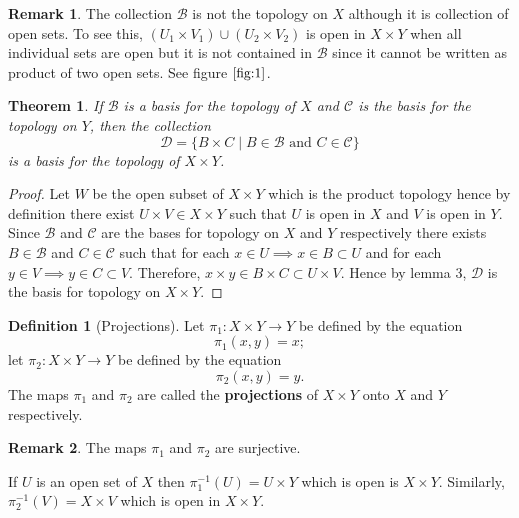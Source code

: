 \documentclass[12pt,reqno]{amsart}
\theoremstyle{plain}
\newtheorem{thm}{Theorem}
\theoremstyle{definition}
\newtheorem{defn}{Definition}
\newtheorem{rem}{Remark}
\newcommand{\cal}[1]{\mathcal{#1}}
\begin{document}
\begin{rem}
    The collection $\cal B$ is not the topology on $X$ although it is collection of open sets. To see this, $(U_1 \times V_1) \cup (U_2 \times V_2)$ is open in $X \times Y$ when all individual sets are open but it is not contained in $\cal B$ since it cannot be written as product of two open sets. See figure $\ref{fig:1}$.
    \begin{figure}[!ht]
        \caption{}
        \label{fig:1}
    \end{figure}
\end{rem}

\begin{thm}
    If $\cal B$ is a basis for the topology of $X$ and $\cal C$ is the basis for the topology on $Y$, then the collection
    $$ \cal D = \{B \times C \mid B \in \cal B \text{ and } C \in \cal C\} $$ 
    is a basis for the topology of $X \times Y$.
\end{thm}
\begin{proof}
    Let $W$ be the open subset of $X \times Y$ which is the product topology hence by definition there exist $U \times V \in X \times Y$ such that $U$ is open in $X$ and $V$ is open in $Y$. Since $\cal B$ and $\cal C$ are the bases for topology on $X$ and $Y$ respectively there exists $B \in \cal B$ and $C \in \cal C$ such that for each $x \in U \implies x \in B \subset U$ and for each $y \in V \implies y \in C \subset V$. Therefore, $x \times y \in B \times C \subset U \times V$. Hence by lemma $3$, $\cal D$ is the basis for topology on $X \times Y$.    
\end{proof}

\begin{defn}[Projections]
    Let $\pi_1 : X \times Y \to Y$ be defined by the equation
    $$ \pi_1(x,y) = x;$$ 
    let $\pi_2 : X \times Y \to Y$ be defined by the equation
    $$ \pi_2(x,y) = y.$$
    The maps $\pi_1$ and $\pi_2$ are called the {\bf projections} of $X \times Y$ onto $X$ and $Y$ respectively.
\end{defn}
\begin{rem}
    The maps $\pi_1$ and $\pi_2$ are surjective.
\end{rem}
If $U$ is an open set of $X$ then $\pi_1^{-1}(U) = U \times Y$ which is open is $X \times Y$. Similarly, $\pi_2^{-1}(V) = X \times V$ which is open in $X \times Y$.
\end{document}
